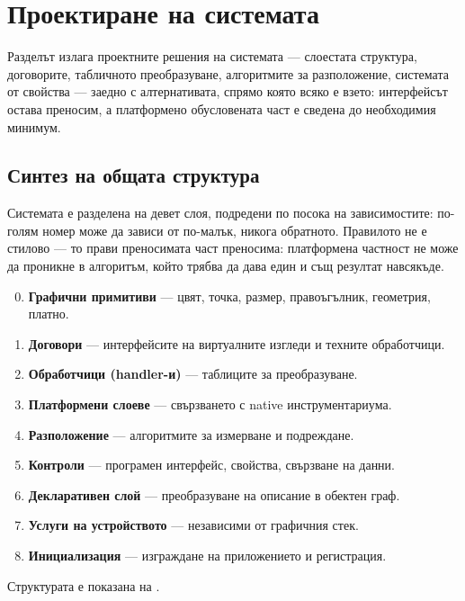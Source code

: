 \section{Проектиране на системата}
\label{sec:design}

Разделът излага проектните решения на системата --- слоестата структура, договорите,
табличното преобразуване, алгоритмите за разположение, системата от свойства --- заедно с
алтернативата, спрямо която всяко е взето: интерфейсът остава преносим, а платформено
обусловената част е сведена до необходимия минимум.

\subsection{Синтез на общата структура}
\label{subsec:structure}

Системата е разделена на девет слоя, подредени по посока на зависимостите: по-голям номер
може да зависи от по-малък, никога обратното. Правилото не е стилово --- то прави
преносимата част преносима: платформена частност не може да проникне в алгоритъм, който
трябва да дава един и същ резултат навсякъде.

\begin{enumerate}[topsep=2pt,itemsep=0pt,leftmargin=*,label=\arabic*.]
\setcounter{enumi}{-1}
\item \textbf{Графични примитиви} --- цвят, точка, размер, правоъгълник, геометрия, платно.
\item \textbf{Договори} --- интерфейсите на виртуалните изгледи и техните обработчици.
\item \textbf{Обработчици (handler-и)} --- таблиците за преобразуване.
\item \textbf{Платформени слоеве} --- свързването с native инструментариума.
\item \textbf{Разположение} --- алгоритмите за измерване и подреждане.
\item \textbf{Контроли} --- програмен интерфейс, свойства, свързване на данни.
\item \textbf{Декларативен слой} --- преобразуване на описание в обектен граф.
\item \textbf{Услуги на устройството} --- независими от графичния стек.
\item \textbf{Инициализация} --- изграждане на приложението и регистрация.
\end{enumerate}

Структурата е показана на .

